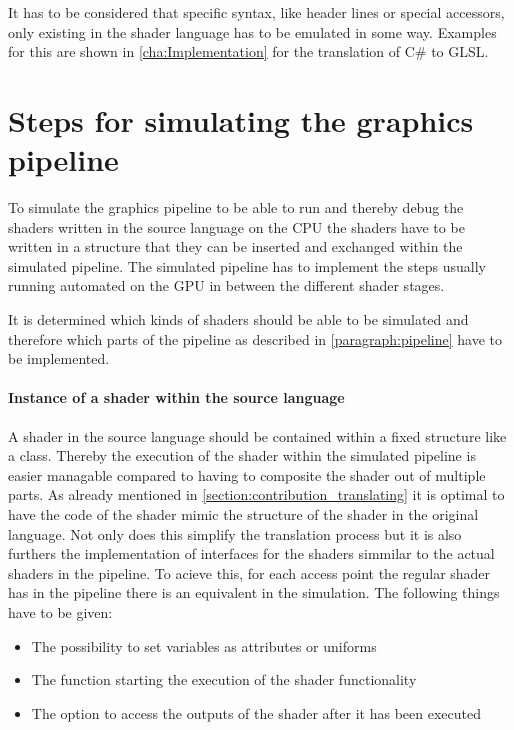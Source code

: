 It has to be considered that specific syntax, like header lines or special accessors, only existing in the shader language has to be emulated in some way. Examples for this are shown in \autoref{cha:Implementation} for the translation of C\# to GLSL.

\section{Steps for simulating the graphics pipeline}
\label{section:contribution_simulating}

To simulate the graphics pipeline to be able to run and thereby debug the shaders written in the source language on the CPU the shaders have to be written in a structure that they can be inserted and exchanged within the simulated pipeline. The simulated pipeline has to implement the steps usually running automated on the GPU in between the different shader stages.

It is determined which kinds of shaders should be able to be simulated and therefore which parts of the pipeline as described in \autoref{paragraph:pipeline} have to be implemented.

\paragraph{Instance of a shader within the source language}

A shader in the source language should be contained within a fixed structure like a class. Thereby the execution of the shader within the simulated pipeline is easier managable compared to having to composite the shader out of multiple parts.
As already mentioned in \autoref{section:contribution_translating} it is optimal to have the code of the shader mimic the structure of the shader in the original language. Not only does this simplify the translation process but it is also furthers the implementation of interfaces for the shaders simmilar to the actual shaders in the pipeline. To acieve this, for each access point the regular shader has in the pipeline there is an equivalent in the simulation. The following things have to be given:
\begin{itemize}
\item The possibility to set variables as attributes or uniforms
\item The function starting the execution of the shader functionality
\item The option to access the outputs of the shader after it has been executed
\end{itemize}

